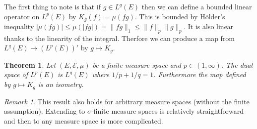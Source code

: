 \documentclass[
]{book}
\newtheorem{theorem}{Theorem}[chapter]
\theoremstyle{definition}
\theoremstyle{definition}
\theoremstyle{definition}
\theoremstyle{definition}
\theoremstyle{remark}
\newtheorem*{remark}{Remark}
\begin{document}
The first thing to note is that if \(g \in L^q(E)\) then we can define a bounded linear operator on \(L^p(E)\) by \(K_g(f) = \mu(fg)\). This is bounded by Hölder's inequality \(|\mu(fg)| \leq \mu(|fg|) = \|fg\|_1 \leq \|f\|_p \|g\|_p\). It is also linear thanks to the linearity of the integral. Therfore we can produce a map from \(L^q(E) \rightarrow (L^p(E))'\) by \(g \mapsto K_g\).

\begin{theorem}
Let \((E, \mathcal{E}, \mu)\) be a finite measure space and \(p \in (1, \infty)\). The dual space of \(L^p(E)\) is \(L^q(E)\) where \(1/p +1/q = 1\). Furthermore the map defined by \(g \mapsto K_g\) is an isometry.
\end{theorem}

\begin{remark}
This result also holds for arbitrary measure spaces (without the finite assumption). Extending to \(\sigma\)-finite measure spaces is relatively straightforward and then to any measure space is more complicated.
\end{remark}
\end{document}
